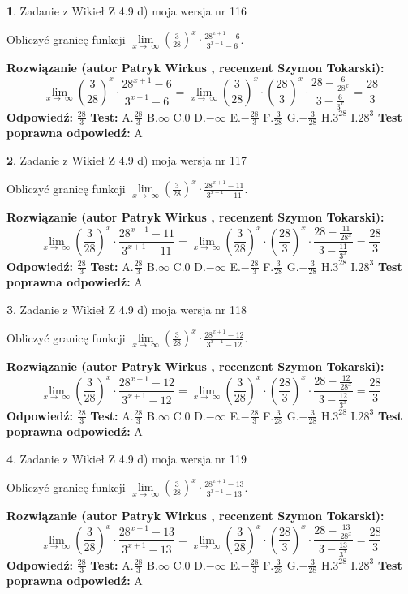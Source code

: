 \documentclass[12pt, a4paper]{article}
\theoremstyle{definition} %
\newtheorem{zad}{}
\newcommand{\zadStart}[1]{\begin{zad}#1\newline}
\newcommand{\zadStop}{\end{zad}}
\newcommand{\rozwStart}[2]{\noindent \textbf{Rozwiązanie (autor #1 , recenzent #2): }\newline}
\newcommand{\rozwStop}{\newline}
\newcommand{\odpStart}{\noindent \textbf{Odpowiedź:}\newline}
\newcommand{\odpStop}{\newline}
\newcommand{\testStart}{\noindent \textbf{Test:}\newline}
\newcommand{\testStop}{\newline}
\newcommand{\kluczStart}{\noindent \textbf{Test poprawna odpowiedź:}\newline}
\newcommand{\kluczStop}{\newline}
\begin{document}
\zadStart{Zadanie z Wikieł Z 4.9 d) moja wersja nr 116}


Obliczyć granicę funkcji  $\lim\limits_{x\to\ \infty}(\frac{3}{28})^{x}\cdot\frac{28^{x+1}-6}{3^{x+1}-6}$.
\zadStop
\rozwStart{Patryk Wirkus}{Szymon Tokarski}
$$\lim\limits_{x\to\ \infty}(\frac{3}{28})^{x}\cdot\frac{28^{x+1}-6}{3^{x+1}-6}=\lim\limits_{x\to\ \infty}(\frac{3}{28})^{x}\cdot(\frac{28}{3})^{x} \cdot \frac{28-\frac{6}{28^{x}}}{3-\frac{6}{3^{x}}} = \frac{28}{3}$$
\rozwStop
\odpStart
$\frac{28}{3}$
\odpStop
\testStart
A.$\frac{28}{3}$ B.$\infty$ C.$0$ D.$-\infty$ E.$-\frac{28}{3}$
F.$\frac{3}{28}$ G.$-\frac{3}{28}$
H.$3^{28}$
I.$28^{3}$
\testStop
\kluczStart
A
\kluczStop



\zadStart{Zadanie z Wikieł Z 4.9 d) moja wersja nr 117}


Obliczyć granicę funkcji  $\lim\limits_{x\to\ \infty}(\frac{3}{28})^{x}\cdot\frac{28^{x+1}-11}{3^{x+1}-11}$.
\zadStop
\rozwStart{Patryk Wirkus}{Szymon Tokarski}
$$\lim\limits_{x\to\ \infty}(\frac{3}{28})^{x}\cdot\frac{28^{x+1}-11}{3^{x+1}-11}=\lim\limits_{x\to\ \infty}(\frac{3}{28})^{x}\cdot(\frac{28}{3})^{x} \cdot \frac{28-\frac{11}{28^{x}}}{3-\frac{11}{3^{x}}} = \frac{28}{3}$$
\rozwStop
\odpStart
$\frac{28}{3}$
\odpStop
\testStart
A.$\frac{28}{3}$ B.$\infty$ C.$0$ D.$-\infty$ E.$-\frac{28}{3}$
F.$\frac{3}{28}$ G.$-\frac{3}{28}$
H.$3^{28}$
I.$28^{3}$
\testStop
\kluczStart
A
\kluczStop



\zadStart{Zadanie z Wikieł Z 4.9 d) moja wersja nr 118}


Obliczyć granicę funkcji  $\lim\limits_{x\to\ \infty}(\frac{3}{28})^{x}\cdot\frac{28^{x+1}-12}{3^{x+1}-12}$.
\zadStop
\rozwStart{Patryk Wirkus}{Szymon Tokarski}
$$\lim\limits_{x\to\ \infty}(\frac{3}{28})^{x}\cdot\frac{28^{x+1}-12}{3^{x+1}-12}=\lim\limits_{x\to\ \infty}(\frac{3}{28})^{x}\cdot(\frac{28}{3})^{x} \cdot \frac{28-\frac{12}{28^{x}}}{3-\frac{12}{3^{x}}} = \frac{28}{3}$$
\rozwStop
\odpStart
$\frac{28}{3}$
\odpStop
\testStart
A.$\frac{28}{3}$ B.$\infty$ C.$0$ D.$-\infty$ E.$-\frac{28}{3}$
F.$\frac{3}{28}$ G.$-\frac{3}{28}$
H.$3^{28}$
I.$28^{3}$
\testStop
\kluczStart
A
\kluczStop



\zadStart{Zadanie z Wikieł Z 4.9 d) moja wersja nr 119}


Obliczyć granicę funkcji  $\lim\limits_{x\to\ \infty}(\frac{3}{28})^{x}\cdot\frac{28^{x+1}-13}{3^{x+1}-13}$.
\zadStop
\rozwStart{Patryk Wirkus}{Szymon Tokarski}
$$\lim\limits_{x\to\ \infty}(\frac{3}{28})^{x}\cdot\frac{28^{x+1}-13}{3^{x+1}-13}=\lim\limits_{x\to\ \infty}(\frac{3}{28})^{x}\cdot(\frac{28}{3})^{x} \cdot \frac{28-\frac{13}{28^{x}}}{3-\frac{13}{3^{x}}} = \frac{28}{3}$$
\rozwStop
\odpStart
$\frac{28}{3}$
\odpStop
\testStart
A.$\frac{28}{3}$ B.$\infty$ C.$0$ D.$-\infty$ E.$-\frac{28}{3}$
F.$\frac{3}{28}$ G.$-\frac{3}{28}$
H.$3^{28}$
I.$28^{3}$
\testStop
\kluczStart
A
\kluczStop
\end{document}
